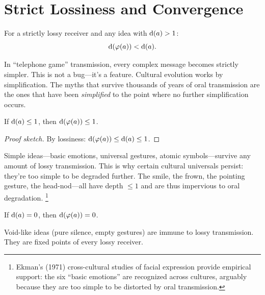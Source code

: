 \section{Strict Lossiness and Convergence}
\label{sec:lossy-strict}

\begin{theorem}
\label{thm:strict-decay}
For a strictly lossy receiver and any idea with $\operatorname{d}(a)>1$:
\[
  \operatorname{d}(\varphi(a)) < \operatorname{d}(a).
\]
\end{theorem}

In ``telephone game'' transmission, every complex message becomes strictly
simpler.  This is not a bug---it's a feature.  Cultural evolution works by
simplification.  The myths that survive thousands of years of oral
transmission are the ones that have been \emph{simplified} to the point
where no further simplification occurs.

\begin{theorem}
\label{thm:shallow-survives}
If $\operatorname{d}(a)\le 1$, then $\operatorname{d}(\varphi(a))\le 1$.
\end{theorem}

\begin{proof}[Proof sketch]
By lossiness: $\operatorname{d}(\varphi(a))\le\operatorname{d}(a)\le 1$.
\end{proof}

Simple ideas---basic emotions, universal gestures, atomic symbols---survive
any amount of lossy transmission.  This is why certain cultural universals
persist: they're too simple to be degraded further.  The smile, the frown,
the pointing gesture, the head-nod---all have depth $\le 1$ and are thus
impervious to oral degradation.%
\footnote{Ekman's (1971) cross-cultural studies of facial expression provide
empirical support: the six ``basic emotions'' are recognized across cultures,
arguably because they are too simple to be distorted by oral transmission.}

\begin{theorem}
\label{thm:zero-depth-survives}
If $\operatorname{d}(a) = 0$, then $\operatorname{d}(\varphi(a)) = 0$.
\end{theorem}

Void-like ideas (pure silence, empty gestures) are immune to lossy
transmission.  They are fixed points of every lossy receiver.


